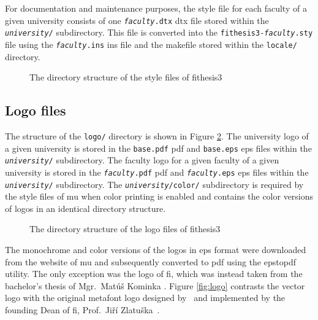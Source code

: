 \documentclass[12pt,twoside,color,table]%
  {fithesis3/fithesis3/fithesis3} %
\makeatletter
\def\thesis#1{\makeatletter\thesis@{#1}\makeatother}
\makeatother
\begin{document}
  For documentation and maintenance purposes, the style file for
  each faculty of a given university consists of one
  \texttt{\textit{faculty}.dtx} \gls{dtx} file stored within the
  \texttt{\textit{university}/} subdirectory. This file is
  converted into the \texttt{fithesis3-\textit{faculty}.sty} file
  using the \texttt{\textit{faculty}.ins} \gls{ins} file and the
  \gls{makefile} stored within the \texttt{locale/} directory.
  
  \begin{figure}
    \centering
    \parbox{0.5\textwidth}{}
    \caption{The directory structure of the style files of
      \textsf{fithesis3}}
    \label{fig:dirs-style}
  \end{figure}
  
  \subsection{Logo files}
  The structure of the \texttt{logo/} directory is shown in Figure
  \ref{fig:dirs-logo}. The university logo of a given
  university is stored in the \texttt{base.pdf} \gls{pdf} and
  \texttt{base.eps} \gls{eps} files within the
  \texttt{\textit{university}/} subdirectory. The faculty logo for
  a given faculty of a given university is stored in the
  \texttt{\textit{faculty}.pdf} \gls{pdf} and
  \texttt{\textit{faculty}.eps} \gls{eps} files within
  the \texttt{\textit{university}/} subdirectory. The
  \texttt{\textit{university}/color/} subdirectory is required by
  the style files of \gls{mu} when color printing is enabled and
  contains the color versions of logos in an identical directory
  structure.

  \begin{figure}
    \centering
    \parbox{0.5\textwidth}{}
    \caption{The directory structure of the logo files of
      \textsf{fithesis3}}
    \label{fig:dirs-logo}
  \end{figure}
  
  The monochrome and color versions of the logos in \gls{eps}
  format were downloaded from the website of \gls{mu} \cite{muvis}
  and subsequently converted to \gls{pdf} using the
  \textsf{epstopdf} utility. The only exception was the
  logo of \gls{fi}, which was instead taken from the bachelor's
  thesis of Mgr.\ Matúš Kominka \cite{Kominka08}. Figure
  \ref{fig:logo} contrasts the vector logo with the original
  \gls{metafont} logo designed by \thesis{advisor}\ and
  implemented by the founding Dean of \gls{fi}, Prof.\ Jiří
  Zlatuška~\cite{filogo}.
\end{document}
